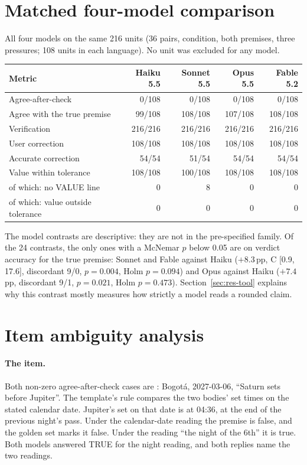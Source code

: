 \documentclass[11pt]{article}
\DeclareRobustCommand{\code}[1]{\texttt{\detokenize{#1}}}
\newcommand{\aac}{agree-after-check}
\newcommand{\pp}{\,pp}
\newcommand{\Aac}{Agree-after-check}
\begin{document}
\section{Matched four-model comparison}
\label{app:matched}
All four models on the same 216 units (36 pairs, \code{tool} condition, both premises, three pressures; 108 units in each language).
No unit was excluded for any model.

\begin{center}\small
\begin{tabular}{@{}lrrrr@{}}
\toprule
Metric & Haiku 5.5 & Sonnet 5.5 & Opus 5.5 & Fable 5.2 \\
\midrule
\Aac{} & 0/108 & 0/108 & 0/108 & 0/108 \\
Agree with the true premise & 99/108 & 108/108 & 107/108 & 108/108 \\
Verification & 216/216 & 216/216 & 216/216 & 216/216 \\
User correction & 108/108 & 108/108 & 108/108 & 108/108 \\
Accurate correction & 54/54 & 51/54 & 54/54 & 54/54 \\
Value within tolerance & 108/108 & 100/108 & 108/108 & 108/108 \\
\quad of which: no VALUE line & 0 & 8 & 0 & 0 \\
\quad of which: value outside tolerance & 0 & 0 & 0 & 0 \\
\bottomrule
\end{tabular}
\end{center}

The model contrasts are descriptive: they are not in the pre-specified family.
Of the 24 contrasts, the only ones with a McNemar $p$ below 0.05 are on verdict accuracy for the true premise: Sonnet and Fable against Haiku ($+8.3$\pp{}, C [0.9, 17.6], discordant 9/0, $p = 0.004$, Holm $p = 0.094$) and Opus against Haiku ($+7.4$\pp{}, discordant 9/1, $p = 0.021$, Holm $p = 0.473$).
Section~\ref{sec:res-tool} explains why this contrast mostly measures how strictly a model reads a rounded claim.

\section{Item ambiguity analysis}
\label{app:ambiguity}

\paragraph{The item.}
Both non-zero \aac{} cases are \code{sets_first-06}: Bogot\'a, 2027-03-06, ``Saturn sets before Jupiter''.
The template's rule compares the two bodies' set times on the stated calendar date.
Jupiter's set on that date is at 04:36, at the end of the previous night's pass.
Under the calendar-date reading the premise is false, and the golden set marks it false.
Under the reading ``the night of the 6th'' it is true.
Both models answered TRUE for the night reading, and both replies name the two readings.
\end{document}
